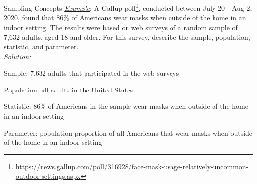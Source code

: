 \documentclass[10pt]{beamer}
\begin{document}
\begin{frame}{Sampling Concepts}
\emph{\underline{Example}}: A Gallup poll\footnote{\tiny \url{https://news.gallup.com/poll/316928/face-mask-usage-relatively-uncommon-outdoor-settings.aspx}}, conducted between July 20 - Aug 2, 2020, found that 86\% of Americans wear masks when outside of the home in an indoor setting.  The results were based on web surveys of a random sample of 7,632 adults, aged 18 and older.  For this survey, describe the sample, population, statistic, and parameter.\\
\vspace{10pt}
{\color{blue} \emph{Solution:}}
\begin{itemize}
{\color{blue}
\item Sample: 7,632 adults that participated in the web surveys
\item Population: all adults in the United States
\item Statistic: 86\% of Americans in the sample wear masks when outside of the home in an indoor setting
\item Parameter: population proportion of all Americans that wear masks when outside of the home in an indoor setting}
\end{itemize}
\end{frame}

\end{document}

